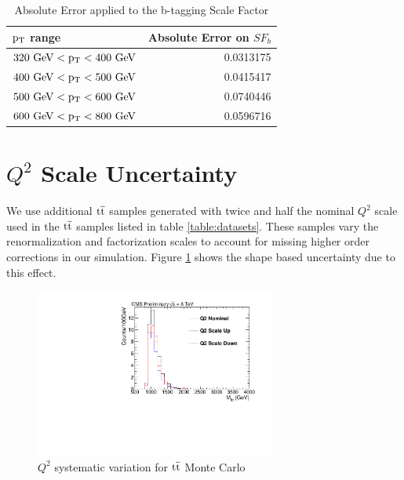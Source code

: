 \begin{table}
\begin{center}
\begin{tabular}{|l|r|} 
\hline
\bf{$\mathrm{p_{T}}$ range } & \bf{Absolute Error on $SF_b$} \\
\hline
$320~\mathrm{GeV} < \mathrm{p_{T}} < 400~\mathrm{GeV}$ & 0.0313175 \\
$400~\mathrm{GeV} < \mathrm{p_{T}} < 500~\mathrm{GeV}$ & 0.0415417 \\
$500~\mathrm{GeV} < \mathrm{p_{T}} < 600~\mathrm{GeV}$ & 0.0740446 \\
$600~\mathrm{GeV} < \mathrm{p_{T}} < 800~\mathrm{GeV}$ & 0.0596716 \\
\hline
\end{tabular}
\end{center}
\caption{Absolute Error applied to the b-tagging Scale Factor}
\label{table:btaggingerrors}
\end{table}



\section{$Q^2$ Scale Uncertainty}
We use additional $\mathrm{t\overline{t}}$ samples generated with twice and half the nominal $Q^2$ 
scale used in the $\mathrm{t\overline{t}}$ samples listed in table \ref{table:datasets}.  These samples vary the renormalization and factorization scales to account for 
missing higher order corrections in our simulation.  Figure \ref{figs:q2scale} shows the shape based uncertainty due to this effect.

\begin{figure}[htcb]
\begin{center}
\includegraphics[width=0.7\textwidth]{AN-13-004/figs/TTbar_Q2Scale}
\caption{
$Q^2$ systematic variation for $\mathrm{t\overline{t}}$ Monte Carlo 
}
\label{figs:q2scale}
\end{center}
\end{figure}

